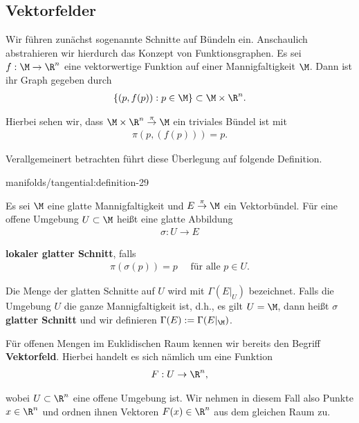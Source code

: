 \documentclass[letterpaper,10pt,german]{jupyterBook}
\begin{document}
\subsection{Vektorfelder}
\label{\detokenize{manifolds/tangential:vektorfelder}}
\par
Wir führen zunächst sogenannte Schnitte auf Bündeln ein.
Anschaulich abstrahieren wir hierdurch das Konzept von Funktionsgraphen.
Es sei \(f:\M\to\R^n\) eine vektorwertige Funktion auf einer Mannigfaltigkeit \(\M\).
Dann ist ihr Graph gegeben durch
\begin{align*}
\{(p,f(p)): p\in\M\}\subset \M\times\R^n.
\end{align*}
\par
Hierbei sehen wir, dass \(\M\times\R^n\overset{\pi}{\to}\M\) ein triviales Bündel ist mit
\begin{align*}
\pi(p,(f(p))) = p.
\end{align*}
\par
Verallgemeinert betrachten führt diese Überlegung auf folgende Definition.
\begin{definition}{}{manifolds/tangential:definition-29}



\par
Es sei \(\M\) eine glatte Mannigfaltigkeit und \(E\overset{\pi}{\to}\M\) ein Vektorbündel.
Für eine offene Umgebung \(U\subset\M\) heißt eine glatte Abbildung
\begin{align*}
\sigma: U\to E
\end{align*}
\par
\textbf{lokaler glatter Schnitt}, falls
\begin{align*}
\pi(\sigma(p)) = p\quad\text{ für alle }p\in U.
\end{align*}
\par
Die Menge der glatten Schnitte auf \(U\) wird mit \(\Gamma(E\rvert_U)\) bezeichnet.
Falls die Umgebung \(U\) die ganze Mannigfaltigkeit ist, d.h., es gilt \(U=\M\), dann heißt \(\sigma\) \textbf{glatter Schnitt} und wir definieren \(\Gamma(E):=\Gamma(E\rvert_\M)\).
\end{definition}

\par
Für offenen Mengen im Euklidischen Raum kennen wir bereits den Begriff \textbf{Vektorfeld}.
Hierbei handelt es sich nämlich um eine Funktion
\begin{align*}
F:U\to\R^n,
\end{align*}
\par
wobei \(U\subset\R^n\) eine offene Umgebung ist.
Wir nehmen in diesem Fall also Punkte \(x\in\R^n\) und ordnen ihnen Vektoren \(F(x)\in\R^n\) aus dem gleichen Raum zu.
\end{document}
